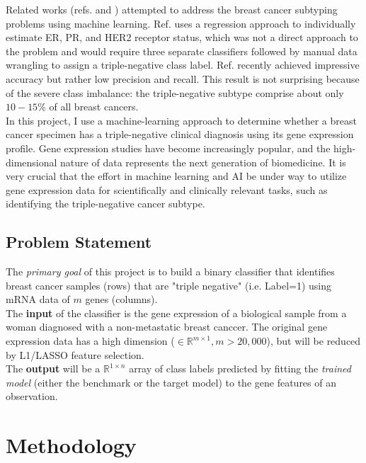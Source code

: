 \documentclass[11pt]{diazessay}
\begin{document}
Related works (refs.\cite{lehmann2011} and \cite{wu2021}) attempted to address the breast cancer subtyping problems using machine learning. Ref.\cite{lehmann2011} uses a regression approach to individually estimate ER, PR, and HER2 receptor status, which was not a direct approach to the problem and would require three separate classifiers followed by manual data wrangling to assign a triple-negative class label. Ref. \cite{wu2021} recently achieved impressive accuracy but rather low precision and recall. This result is not surprising because of the severe class imbalance: the triple-negative subtype comprise about only $10-15\%$ of all breast cancers. \\

In this project, I use a machine-learning approach to determine whether a breast cancer specimen has a triple-negative clinical diagnosis using its gene expression profile. Gene expression studies have become increasingly popular, and the high-dimensional nature of data represents the next generation of biomedicine. It is very crucial that the effort in machine learning and AI be under way to utilize gene expression data for scientifically and clinically relevant tasks, such as identifying the triple-negative cancer subtype.

\subsection{Problem Statement}

The \textit{primary goal} of this project is to build a binary classifier that identifies breast cancer samples (rows) that are "triple negative" (i.e. Label=1) using mRNA data of $m$ genes (columns). \\

 The \textbf{input} of the classifier is the gene expression of a biological sample from a woman diagnosed with a non-metastatic breast canccer. The original gene expression data has a high dimension  ($\in \mathbb{R}^{m \times 1}, m > 20,000$), but will be reduced by L1/LASSO feature selection. \\
 
The \textbf{output} will be a $\mathbb{R}^{1 \times n}$ array of class labels predicted by fitting the \textit{trained model} (either the benchmark or the target model) to the gene features of an observation.


\section{Methodology}
\end{document}
